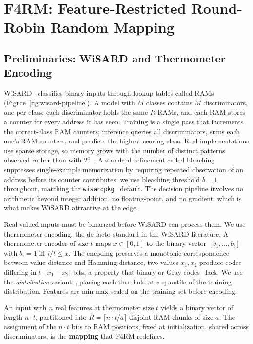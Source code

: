 \section{F4RM: Feature-Restricted Round-Robin Random Mapping} \label{sec:f4rm}

\subsection{Preliminaries: WiSARD and Thermometer Encoding}
\label{sec:f4rm-prelim}

WiSARD~\cite{aleksander1984wisard} classifies binary inputs through lookup tables called RAMs (Figure~\ref{fig:wisard-pipeline}). A model with $M$ classes contains $M$ discriminators, one per class; each discriminator holds the same $R$ RAMs, and each RAM stores a counter for every address it has seen. Training is a single pass that increments the correct-class RAM counters; inference queries all discriminators, sums each one's RAM counters, and predicts the highest-scoring class. Real implementations use sparse storage, so memory grows with the number of distinct patterns observed rather than with $2^a$~\cite{susskind2022bthowen}. A standard refinement called bleaching~\cite{grieco2010producing} suppresses single-example memorization by requiring repeated observation of an address before its counter contributes; we use bleaching threshold $b = 1$ throughout, matching the \texttt{wisardpkg}~\cite{wisardpkg} default. The decision pipeline involves no arithmetic beyond integer addition, no floating-point, and no gradient, which is what makes WiSARD attractive at the edge.

Real-valued inputs must be binarized before WiSARD can process them. We use thermometer encoding, the de facto standard in the WiSARD literature. A thermometer encoder of size $t$ maps $x \in [0,1]$ to the binary vector $[b_1,\ldots,b_t]$ with $b_i = 1$ iff $i/t \leq x$. The encoding preserves a monotonic correspondence between value distance and Hamming distance, two values $x_1, x_2$ produce codes differing in $t \cdot |x_1 - x_2|$ bits, a property that binary or Gray codes~\cite{gray1953pulse} lack. We use the \emph{distributive} variant~\cite{lima2020distributive}, placing each threshold at a quantile of the training distribution. Features are min-max scaled on the training set before encoding.

An input with $n$ real features at thermometer size $t$ yields a binary vector of length $n \cdot t$, partitioned into $R = \lceil n \cdot t / a \rceil$ disjoint RAM chunks of size $a$. The assignment of the $n \cdot t$ bits to RAM positions, fixed at initialization, shared across discriminators, is the \textbf{mapping} that F4RM redefines.

